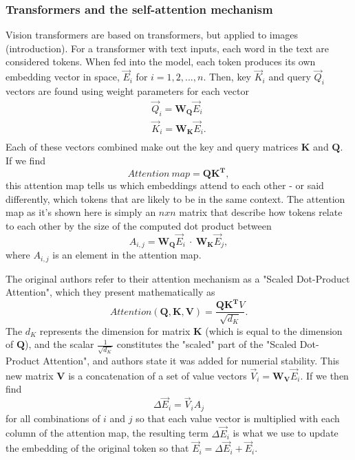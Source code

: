 \subsubsection{Transformers and the self-attention mechanism}
Vision transformers are based on transformers, but applied to images (introduction). For a transformer with text inputs, each word in the text are considered tokens. When fed into the model, each token produces its own embedding vector in space, $\vec{E}_i$ for $i = {1, 2, ..., n}$. Then, key $\vec{K}_i$ and query $\vec{Q}_i$ vectors are found using weight parameters for each vector
\begin{equation}
    \begin{split}
    \vec{Q}_i = \boldsymbol{W_Q} \vec{E}_i  \\
    \vec{K}_i = \boldsymbol{W_K} \vec{E}_i . \\
    \end{split}
\end{equation}
Each of these vectors combined make out the key and query matrices $\boldsymbol{K}$ and $\boldsymbol{Q}$. If we find
\begin{equation}
    Attention\ map = \boldsymbol{QK^T},
\end{equation}
this attention map tells us which embeddings attend to each other - or said differently, which tokens that are likely to be in the same context. The attention map as it's shown here is simply an $n x n$ matrix that describe how tokens relate to each other by the size of the computed dot product between 
\begin{equation}
   A_{i, j} =  \boldsymbol{W_Q} \vec{E}_i \ \cdot \ \boldsymbol{W_K} \vec{E}_j, 
\end{equation}
where $A_{i, j}$ is an element in the attention map. 

The original authors refer to their attention mechanism as a "Scaled Dot-Product Attention", which they present mathematically as
\begin{equation}
    Attention(\boldsymbol{Q, K, V}) = \frac{\boldsymbol{QK^T} V}{\sqrt{d_K}}.
\end{equation}
The $d_K$ represents the dimension for matrix $\boldsymbol{K}$ (which is equal to the dimension of $\boldsymbol{Q}$), and the scalar $\frac{1}{\sqrt{d_K}}$ constitutes the "scaled" part of the "Scaled Dot-Product Attention", and authors state it was added for numerial stability. This new matrix $\boldsymbol{V}$ is a concatenation of a set of value vectors $\vec{V}_i = \boldsymbol{W_V}\vec{E}_i$. If we then find
\begin{equation}
    \Delta\vec{E}_i = \vec{V}_i A_j  
\end{equation}
for all combinations of $i$ and $j$ so that each value vector is multiplied with each column of the attention map, the resulting term $\Delta\vec{E}_i$ is what we use to update the embedding of the original token so that $\vec{E}_i  = \Delta\vec{E}_i + \vec{E}_i $. 

